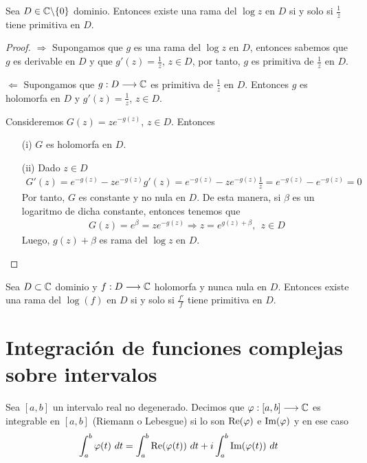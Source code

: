 \begin{prop}
    Sea $D \in \mathbb{C} \backslash \{0\}$ dominio. Entonces existe una rama del $\log z$ en $D$ si y solo si $\frac{1}{z}$ tiene primitiva en $D$.
\end{prop}

\begin{proof}
    $\boxed{\Longrightarrow}$ Supongamos que $g$ es una rama del $\log z$ en $D$, entonces sabemos que $g$ es derivable en $D$ y que $g'(z) = \frac{1}{z}$, $z \in D$, por tanto, $g$ es primitiva de $\frac{1}{z}$ en $D$.

    $\boxed{\Longleftarrow}$ Supongamos que $g: D \longrightarrow \mathbb{C}$ es primitiva de $\frac{1}{z}$ en $D$. Entonces $g$ es holomorfa en $D$ y $g'(z) = \frac{1}{z}$, $z \in D$.

    Consideremos $G(z) = ze^{-g(z)}$, $z \in D$. Entonces
    \begin{enumerate}
        \item[(i)] $G$ es holomorfa en $D$.
        \item[(ii)] Dado $z \in D$
              \begin{align*}
                  G'(z) = e^{-g(z)} - ze^{-g(z)}g'(z) = e^{-g(z)} - ze^{-g(z)} \frac{1}{z}= e^{-g(z)} - e^{-g(z)} = 0
              \end{align*}
              Por tanto, $G$ es constante y no nula en $D$. De esta manera, si $\beta$ es un logaritmo de dicha constante, entonces tenemos que
              \begin{align*}
                  G(z) = e^{\beta} = ze^{-g(z)} \Longrightarrow  z = e^{g(z) + \beta}, \ \ z \in D
              \end{align*}
              Luego, $g(z) + \beta$ es rama del $\log z$ en $D$.
    \end{enumerate}
\end{proof}

\begin{prop}
    Sea $D \subset \mathbb{C}$ dominio y $f: D \longrightarrow \mathbb{C}$ holomorfa y nunca nula en $D$. Entonces existe una rama del $\log (f)$ en $D$ si y solo si $\frac{f'}{f}$ tiene primitiva en $D$.
\end{prop}

\section{Integración de funciones complejas sobre intervalos}

\begin{defi}
    Sea $[a,b]$ un intervalo real no degenerado. Decimos que $\varphi : [a,b] \longrightarrow \mathbb{C}$ es integrable en $[a,b]$ (Riemann o Lebesgue) si lo son $\text{Re}(\varphi)$ e $\text{Im}(\varphi)$ y en ese caso
    \begin{align*}
        \int_{a}^{b}{\varphi(t) \ dt} = \int_{a}^{b}{\re(\varphi(t)) \ dt} + i\int_{a}^{b}{\im(\varphi(t)) \ dt}
    \end{align*}
\end{defi}

